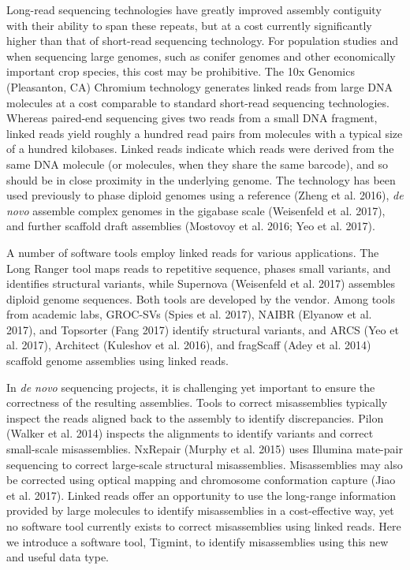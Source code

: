 \documentclass[
  12pt,
  oneside,
  openany]{book}
\begin{document}
Long-read sequencing technologies have greatly improved assembly contiguity with their ability to span these repeats, but at a cost currently significantly higher than that of short-read sequencing technology. For population studies and when sequencing large genomes, such as conifer genomes and other economically important crop species, this cost may be prohibitive. The 10x Genomics (Pleasanton, CA) Chromium technology generates linked reads from large DNA molecules at a cost comparable to standard short-read sequencing technologies. Whereas paired-end sequencing gives two reads from a small DNA fragment, linked reads yield roughly a hundred read pairs from molecules with a typical size of a hundred kilobases. Linked reads indicate which reads were derived from the same DNA molecule (or molecules, when they share the same barcode), and so should be in close proximity in the underlying genome. The technology has been used previously to phase diploid genomes using a reference (Zheng et al. 2016), \emph{de novo} assemble complex genomes in the gigabase scale (Weisenfeld et al. 2017), and further scaffold draft assemblies (Mostovoy et al. 2016; Yeo et al. 2017).

A number of software tools employ linked reads for various applications. The Long Ranger tool maps reads to repetitive sequence, phases small variants, and identifies structural variants, while Supernova (Weisenfeld et al. 2017) assembles diploid genome sequences. Both tools are developed by the vendor. Among tools from academic labs, GROC-SVs (Spies et al. 2017), NAIBR (Elyanow et al. 2017), and Topsorter (Fang 2017) identify structural variants, and ARCS (Yeo et al. 2017), Architect (Kuleshov et al. 2016), and fragScaff (Adey et al. 2014) scaffold genome assemblies using linked reads.

In \emph{de novo} sequencing projects, it is challenging yet important to ensure the correctness of the resulting assemblies. Tools to correct misassemblies typically inspect the reads aligned back to the assembly to identify discrepancies. Pilon (Walker et al. 2014) inspects the alignments to identify variants and correct small-scale misassemblies. NxRepair (Murphy et al. 2015) uses Illumina mate-pair sequencing to correct large-scale structural misassemblies. Misassemblies may also be corrected using optical mapping and chromosome conformation capture (Jiao et al. 2017). Linked reads offer an opportunity to use the long-range information provided by large molecules to identify misassemblies in a cost-effective way, yet no software tool currently exists to correct misassemblies using linked reads. Here we introduce a software tool, Tigmint, to identify misassemblies using this new and useful data type.
\end{document}

